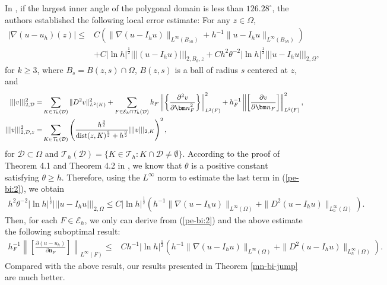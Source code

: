 \documentclass[1996/10/24]{amsart}
\theoremstyle{definition}
\numberwithin{equation}{section}
\begin{document}
In \cite[Theorem 4.2]{hltwz2026}, if the largest inner angle of the polygonal domain is less than $126.28^\circ$, the authors established the following local error estimate: For any $z\in\Omega$,
\begin{align}
|\nabla(u-u_h)(z)|\leq& C\left(\|\nabla(u-I_hu)\|_{L^{\infty}(B_{5h})}+h^{-1}\|u-I_hu\|_{L^{\infty}(B_{5h})}\right)\nonumber\\
&+C|\ln h|^{\frac{1}{2}}|||(u-I_hu)|||_{2,B_{\theta},z}+Ch^2\theta^{-2}|\ln h|^{\frac{1}{2}}|||u-I_hu|||_{2,\Omega},\label{pe-bi:2}
\end{align}
for $k\geq 3$,
where $B_s=B(z,s)\cap\Omega$, $B(z,s)$ is a ball of radius $s$ centered at $z$, and
\begin{align*}
|||v|||_{2,\mathcal{D}}^2=&\sum_{K\in\mathcal{T}_h(\mathcal{D})}\|D^2v\|^2_{L^2(K)}+\sum_{F\in\mathcal{E}_h\cap\mathcal{T}_h(\mathcal{D})}h_F
\left\|\left\{\frac{\partial^2v}{\partial{\bm n}_F^2}\right\}\right\|^2_{L^2(F)}+h_F^{-1}\left\|\left[\frac{\partial v}{\partial{\bm n}_F}\right]\right\|^2_{L^2(F)},\\
|||v|||_{2,\mathcal{D},z}^2=&\sum_{K\in\mathcal{T}_h(\mathcal{D})}\left(\frac{h^\frac{3}{2}}{{\rm dist}(z,K)^{\frac{3}{2}}+h^{\frac{3}{2}}}|||v|||_{2,K}\right)^2,
\end{align*}
for $\mathcal{D}\subset\Omega$ and $\mathcal{T}_h(\mathcal{D})=\{K\in\mathcal{T}_h: K\cap\mathcal{D}\neq\emptyset\}$.
According to the proof of Theorem 4.1 and Theorem 4.2 in \cite{hltwz2026}, we know that $\theta$ is a positive constant satisfying $\theta\geq h$. Therefore,
using the $L^{\infty}$ norm to estimate the last term in (\ref{pe-bi:2}), we obtain
\begin{align*}
h^2\theta^{-2}|\ln h|^{\frac{1}{2}}|||u-I_hu|||_{2,\Omega}\leq C|\ln h|^{\frac{1}{2}}\left(h^{-1}\|\nabla(u-I_hu)\|_{L^{\infty}(\Omega)}+
\|D^2(u-I_hu)\|_{L_h^{\infty}(\Omega)}\right).
\end{align*}
Then, for each $F\in\mathcal{E}_h$, we only can derive from (\ref{pe-bi:2}) and the above estimate the following suboptimal result:
\begin{align*}
h_F^{-1}\left\|\left[\frac{\partial(u-u_h)}{\partial {\bm n}_F}\right]\right\|_{L^{\infty}(F)}\leq& Ch^{-1}|\ln h|^{\frac{1}{2}}\left(h^{-1}\|\nabla(u-I_hu)\|_{L^{\infty}(\Omega)}+\|D^2(u-I_hu)\|_{L_h^{\infty}(\Omega)}\right).
\end{align*}
Compared with the above result, our results presented in Theorem \ref{mn-bi-jump} are much better.
\end{document}
